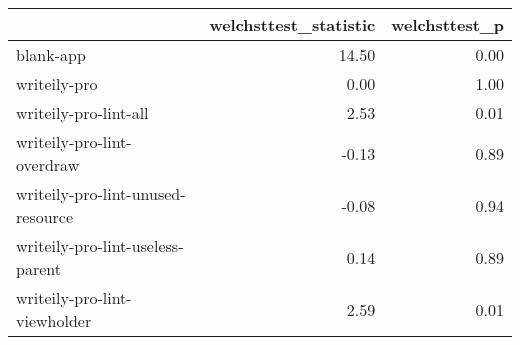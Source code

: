 \begin{tabular}{lrr}
\toprule
{} &  welchsttest\_statistic &  welchsttest\_p \\
\midrule
blank-app                         &                  14.50 &           0.00 \\
writeily-pro                      &                   0.00 &           1.00 \\
writeily-pro-lint-all             &                   2.53 &           0.01 \\
writeily-pro-lint-overdraw        &                  -0.13 &           0.89 \\
writeily-pro-lint-unused-resource &                  -0.08 &           0.94 \\
writeily-pro-lint-useless-parent  &                   0.14 &           0.89 \\
writeily-pro-lint-viewholder      &                   2.59 &           0.01 \\
\bottomrule
\end{tabular}
